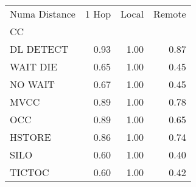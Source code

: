 \begin{tabular}{lrrr}
\toprule
Numa Distance &  1 Hop &  Local &  Remote \\
CC        &        &        &         \\
\midrule
DL DETECT &   0.93 &   1.00 &    0.87 \\
WAIT DIE  &   0.65 &   1.00 &    0.45 \\
NO WAIT   &   0.67 &   1.00 &    0.45 \\
MVCC      &   0.89 &   1.00 &    0.78 \\
OCC       &   0.89 &   1.00 &    0.65 \\
HSTORE    &   0.86 &   1.00 &    0.74 \\
SILO      &   0.60 &   1.00 &    0.40 \\
TICTOC    &   0.60 &   1.00 &    0.42 \\
\bottomrule
\end{tabular}

